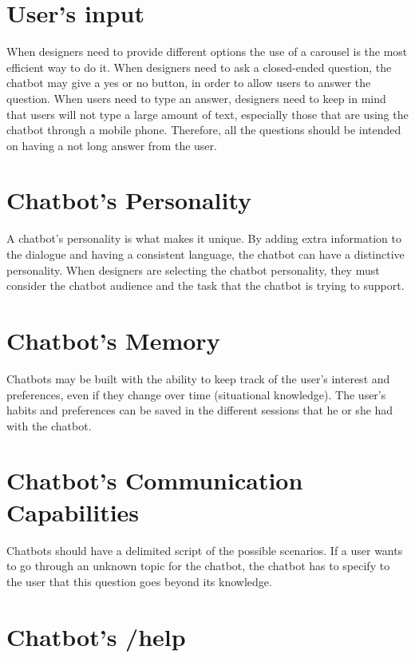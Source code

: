 \documentclass[a4paper,10pt]{article}
\begin{document}
\section{User's input}

When designers need to provide different options the use of a carousel is the most efficient way to do it. When designers need to ask a closed-ended question, the chatbot may give a yes or no button, in order to allow users to answer the question. When users need to type an answer, designers need to keep in mind that users will not type a large amount of text, especially those that are using the chatbot through a mobile phone. Therefore, all the questions should be intended on having a not long answer from the user. 

\section{Chatbot's Personality}

A chatbot’s personality is what makes it unique. By adding extra information to the dialogue and having a consistent language, the chatbot can have a distinctive personality. When designers are selecting the chatbot personality, they must consider the chatbot audience and the task that the chatbot is trying to support.

\section{Chatbot's Memory}

Chatbots may be built with the ability to keep track of the user’s interest and preferences, even if they change over time (situational knowledge).  The user’s habits and preferences can be saved in the different sessions that he or she had with the chatbot.

\section{Chatbot's Communication Capabilities}

Chatbots should have a delimited script of the possible scenarios. If a user wants to go through an unknown topic for the chatbot, the chatbot has to specify to the user that this question goes beyond its knowledge.

\section{Chatbot's /help}
\end{document}
